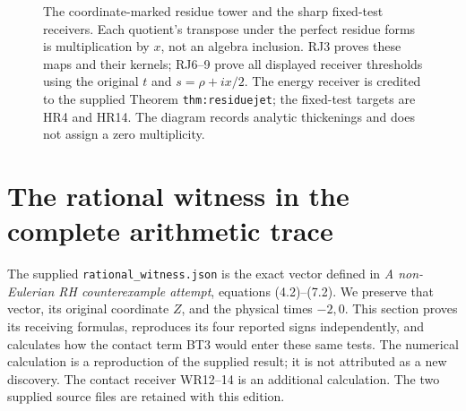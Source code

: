 \documentclass[11pt,a4paper]{article}
\theoremstyle{definition}\newtheorem{definition}[theorem]{Definition}
\begin{document}
\begin{figure}[p]
\centering
{}
\caption{The coordinate-marked residue tower and the sharp fixed-test
receivers. Each quotient's transpose under the perfect residue forms
is multiplication by $x$, not an algebra inclusion. RJ3 proves these
maps and their kernels; RJ6--9 prove all displayed receiver thresholds
using the original $t$ and $s=\rho+ix/2$. The energy receiver is credited
to the supplied Theorem \texttt{thm:residuejet}; the fixed-test targets
are HR4 and HR14. The diagram records analytic thickenings and does not
assign a zero multiplicity.}
\end{figure}

\clearpage
\section{The rational witness in the complete arithmetic trace}
\label{sec:witness-receiver}

The supplied \texttt{rational\_witness.json} is the exact vector
defined in \emph{A non-Eulerian RH counterexample attempt}, equations
(4.2)--(7.2). We preserve that vector, its original coordinate $Z$,
and the physical times $-2,0$. This section proves its receiving
formulas, reproduces its four reported signs independently, and
calculates how the contact term BT3 would enter these same tests.
The numerical calculation is a reproduction of the supplied result;
it is not attributed as a new discovery. The contact receiver WR12--14
is an additional calculation. The two supplied source files are
retained with this edition.
\end{document}
